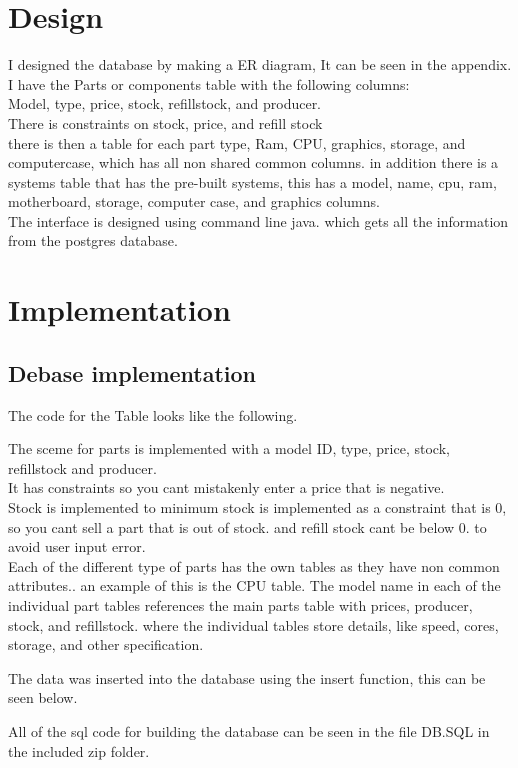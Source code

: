 \documentclass[a4paper,10pt,titlepage]{report}
\begin{document}
\section{Design}
I designed the database by making a ER diagram, It can be seen in the appendix.
I have the Parts or components table with the following columns:
\\ \vspace{2 mm}
Model, type, price, stock, refillstock, and producer. 
\\ \vspace{2 mm}
There is constraints on stock, price, and refill stock
\\
there is then a table for each part type, Ram, CPU, graphics, storage, and computercase, which has all non shared common columns.
in addition there is a systems table that has the pre-built systems, this has a model, name, cpu, ram, motherboard, storage, computer case, and graphics columns.
\\
The interface is designed using command line java. which gets all the information from the postgres database.




\newpage
\section{Implementation}
\subsection{Debase implementation}

The code for the Table looks like the following.


The sceme for parts is implemented with a model ID, type, price, stock, refillstock and producer.
\\
It has constraints so you cant mistakenly enter a price that is negative.
\\
Stock is implemented to minimum stock is implemented as a constraint that is 0, so you cant sell a part that is out of stock. and refill stock cant be below 0. to avoid user input error.
\\ \vspace{2 mm}
Each of the different type of parts has the own tables as they have non common attributes.. an example of this is the CPU table. The model name in each of the individual part tables references the main parts table with prices, producer, stock, and refillstock. where the individual tables store details, like speed, cores, storage, and other specification.

The data was inserted into the database using the insert function, this can be seen below. 

\vspace{5 mm}
All of the sql code for building the database can be seen in the file DB.SQL in the included zip folder.
\newpage
\end{document}
